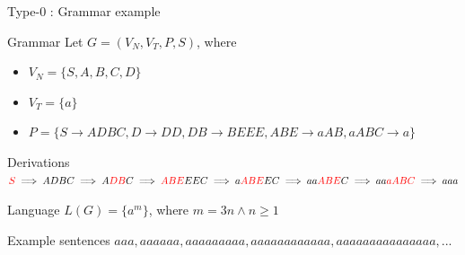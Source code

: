 \documentclass{beamer}
\begin{document}

\begin{frame}{Type-0 : Grammar example}
	\begin{block}{Grammar}
		Let $G = (V_N, V_T, P, S)$, where 
		\begin{itemize}
			\item $V_N = \{S, A, B, C, D\}$
			\item $V_T = \{a\}$
			\item \footnotesize$P = \{S\rightarrow ADBC, D\rightarrow DD, DB\rightarrow BEEE, ABE\rightarrow aAB, aABC\rightarrow a\}$
		\end{itemize}
	\end{block}
	
	\begin{block}{Derivations}
		$\textcolor{red}{S}\implies ADBC \implies A\textcolor{red}{DB}C \implies \textcolor{red}{ABE}EEC \implies a\textcolor{red}{ABE}EC \implies aa\textcolor{red}{ABE}C \implies aa\textcolor{red}{aABC} \implies aaa $
	\end{block}
	
	\begin{block}{Language}
		$L(G) = \{a^{m}\}$, where $m=3n \land n \geq 1$
	\end{block}
	
	\begin{exampleblock}{Example sentences}
		$aaa, aaaaaa, aaaaaaaaa, aaaaaaaaaaaa, aaaaaaaaaaaaaaa, ...$
	\end{exampleblock}
\end{frame}

\end{document}
